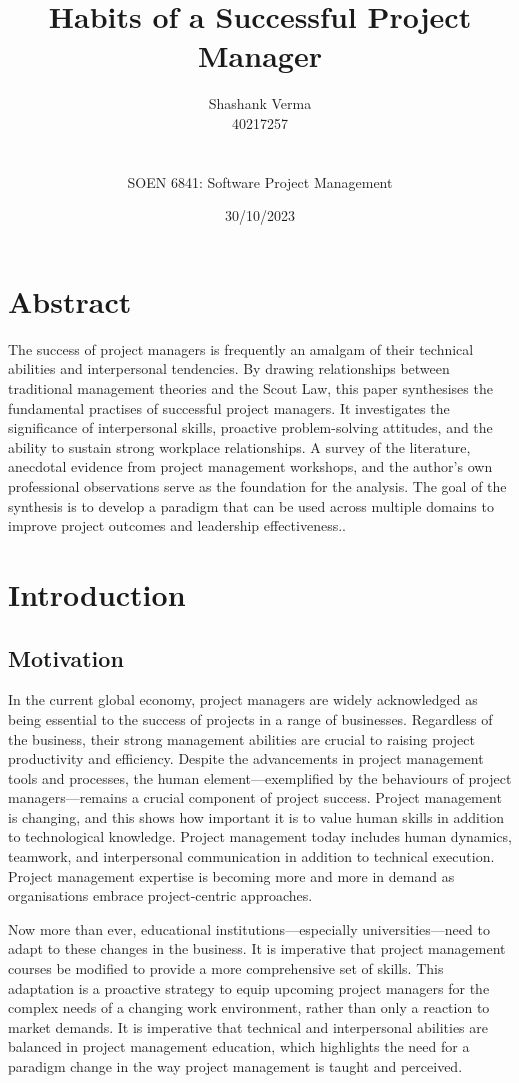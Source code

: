 \documentclass{article}
\title{Habits of a Successful Project Manager}
\author{Shashank Verma \\ 40217257
\\
\\
\\
SOEN 6841: Software Project Management}
\date{30/10/2023}
\begin{document}
\maketitle
{}

\newpage
\tableofcontents
\newpage
{}

\section{Abstract}
The success of project managers is frequently an amalgam of their technical abilities and interpersonal tendencies. By drawing relationships between traditional management theories and the Scout Law, this paper synthesises the fundamental practises of successful project managers. It investigates the significance of interpersonal skills, proactive problem-solving attitudes, and the ability to sustain strong workplace relationships. A survey of the literature, anecdotal evidence from project management workshops, and the author's own professional observations serve as the foundation for the analysis. The goal of the synthesis is to develop a paradigm that can be used across multiple domains to improve project outcomes and leadership effectiveness.\cite{pant2008project}.

\section{Introduction}
\subsection{Motivation}
In the current global economy, project managers are widely acknowledged as being essential to the success of projects in a range of businesses. Regardless of the business, their strong management abilities are crucial to raising project productivity and efficiency. Despite the advancements in project management tools and processes, the human element—exemplified by the behaviours of project managers—remains a crucial component of project success. Project management is changing, and this shows how important it is to value human skills in addition to technological knowledge. Project management today includes human dynamics, teamwork, and interpersonal communication in addition to technical execution. Project management expertise is becoming more and more in demand as organisations embrace project-centric approaches.

Now more than ever, educational institutions—especially universities—need to adapt to these changes in the business. It is imperative that project management courses be modified to provide a more comprehensive set of skills. This adaptation is a proactive strategy to equip upcoming project managers for the complex needs of a changing work environment, rather than only a reaction to market demands. It is imperative that technical and interpersonal abilities are balanced in project management education, which highlights the need for a paradigm change in the way project management is taught and perceived.
\end{document}
